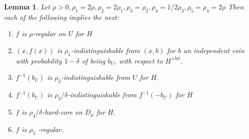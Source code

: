 \documentclass[a4paper]{article}
\newtheorem{lemma}[theorem]{Lemma}
\begin{document}
\begin{lemma}
Let $\rho > 0, \rho_1 = 2 \rho, \rho_2 =  2 \rho_1, \rho_3 = \rho_2, \rho_4 =1/2 \rho_3, \rho_5=
\rho_4 = 2 \rho$ Then each of the following implies the next:
\begin{enumerate}
\item $f$ is $\rho$-regular on $U$ for $H$
\item $(x, f(x))$ is $\rho_1$-indistinguishable from $(x,b)$ for $b$ an independent coin with
probability $1-\delta$ of being $b_U$, with respect to $H^{+bit}$.  
\item $f^{-1} (b_U)$ is $\rho_2$-indistinguishable from $U$ for $H$.
\item $f^{-1} (b_U)$ is $\rho_3/\delta$-indistinguishable from $f^{-1} (-b_U)$ for $H$
\item $f$ is $\rho_4/\delta$-hard-core on $D_{\mu}$ for $H$.
\item $f$ is $\rho_5$ -regular.

\end{enumerate}
\end{lemma}
\end{document}
